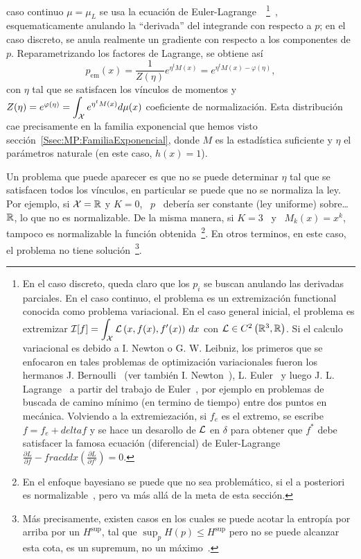 caso continuo $\mu = \mu_L$ se usa la ecuaci\'on de Euler-Lagrange~ \footnote{En
el caso  discreto, queda claro  que los $p_i$  se buscan anulando  las derivadas
parciales. En  el caso  continuo, el problema  es un  extremizaci\'on functional
conocida como problema variacional.  En el  caso general inicial, el problema es
extremizar $\displaystyle \mathcal{I}[f]  = \int_{\mathcal{X}} \mathcal{L}\left( x , f(x)  , f'(x) \right) \,
dx$ con $\mathcal{L}  \in C^2\left( \mathbb{R}^3 , \mathbb{R} \right)$.   Si el calculo variacional
es debido a I.  Newton o G. W.  Leibniz, los primeros que  se enfocaron en tales
problemas   de    optimizaci\'on   variacionales   fueron   los    hermanos   J.
Bernoulli~\cite{Ber1697,       Ber1701,       Ber1718}      (ver       tambi\'en
I. Newton~\cite{New1696}), L.  Euler~\cite{Eul1738, Eul1744, Eul1766} y luego J.
L.   Lagrange~\cite{Lag1760:1,  Lag1760:2,  Lag1766}  a partir  del  trabajo  de
Euler~\cite{Gol80, Fra92, Fra94, BraSan07}, por  ejemplo en problemas de buscada
de  camino m\'inimo  (en  termino de  tiempo) entre  dos  puntos en  mec\'anica.
Volviendo a la extremiezaci\'on,  si $f_e$ es el extremo, se escribe  $f = f_e +
delta f$ y se hace un desarollo de  $\mathcal{L}$ en $\delta$ para obtener que $f^*$ debe
satisfacer    la    famosa    ecuaci\'on   (diferencial)    de    Euler-Lagrange
$\displaystyle \frac{\partial L}{\partial f} - frac{d}{dx} \left( \frac{\partial
L}{\partial  f'}   \right)  =  0$.\label{Foot:SZ:EulerLagrange}}~\cite{GelFom63,
Wei74,  Bru04,  Cla13, Kom14},  esquematicamente  anulando  la ``derivada''  del
integrande  con respecto  a $p$;  en  el caso  discreto, se  anula realmente  un
gradiente con respecto a los  componentes de $p$.  Reparametrizando los factores
de Lagrange, se obtiene as\'i
%
\[
p_{\mathrm{em}}(x) = \frac{1}{Z(\eta)} e^{\eta^t M(x)} = e^{\eta^t M(x) - \varphi(\eta)},
\]
%
con  $\eta$ tal que  se satisfacen  los v\'inculos  de momentos  y \  $Z(\eta) =
e^{\varphi(\eta)} =  \displaystyle \int_{\mathcal{X}} e^{\eta^t  M(x)} d\mu(x)$ coeficiente
de  normalizaci\'on.   Esta  distribuci\'on   cae  precisamente  en  la  familia
exponencial  que hemos  visto  secci\'on~\ref{Ssec:MP:FamiliaExponencial}, donde
$M$ es  la estad\'istica suficiente y  $\eta$ el par\'ametros  naturale (en este
caso, $h(x) = 1$).

Un problema que puede  aparecer es que no se puede determinar  $\eta$ tal que se
satisfacen todos los  v\'inculos, en particular se puede que  no se normaliza la
ley.  Por ejemplo,  si $\mathcal{X} = \mathbb{R}$ y  $K = 0$, \ $p$ \  deber\'ia ser constante
(ley  uniforme) sobre\ldots  $\mathbb{R}$, lo  que no  es normalizable.  De  la misma
manera, si $K  = 3$ \ y \  $M_k(x) = x^k$, tampoco es  normalizable la funci\'on
obtenida~\footnote{En el  enfoque bayesiano se puede que  no sea problem\'atico,
  si el  a posteriori es normalizable~\cite{Rob07},  pero va m\'as  all\'a de la
  meta de  esta secci\'on.}.  En  otros terminos, en  este caso, el  problema no
tiene soluci\'on~\footnote{M\'as  precisamente, existen  casos en los  cuales se
  puede acotar la entrop\'ia por arriba  por un $H^{\sup}$, tal que $\sup_p H(p)
  \le H^{\sup}$ pero no  se puede alcanzar esta cota, \ie es  un supremum, no un
  m\'aximo~\cite[sec.~12.3]{CovTho06}.}.


